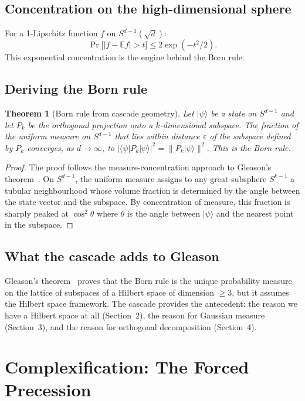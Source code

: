 \documentclass[12pt,a4paper]{article}
\newtheorem{theorem}{Theorem}[section]
\begin{document}
\subsection{Concentration on the high-dimensional sphere}

For a 1-Lipschitz function $f$ on $S^{d-1}(\sqrt{d})$:
\[
\Pr\big[|f-\mathbb{E}f|>t\big]\leq 2\exp(-t^2/2).
\]
This exponential concentration is the engine behind the Born rule.

\subsection{Deriving the Born rule}

\begin{theorem}[Born rule from cascade geometry]\label{thm:born}
Let $|\psi\rangle$ be a state on $S^{d-1}$ and let $P_k$ be the orthogonal projection onto
a $k$-dimensional subspace. The fraction of the uniform measure on $S^{d-1}$ that lies
within distance $\varepsilon$ of the subspace defined by $P_k$ converges, as $d\to\infty$,
to $|\langle\psi|P_k|\psi\rangle|^2=\|P_k|\psi\rangle\|^2$. This is the Born rule.
\end{theorem}
\begin{proof}
The proof follows the measure-concentration approach to Gleason's theorem~\cite{fuchs,clifton}.
On $S^{d-1}$, the uniform measure assigns to any great-subsphere $S^{k-1}$ a tubular
neighbourhood whose volume fraction is determined by the angle between the state vector and
the subspace. By concentration of measure, this fraction is sharply peaked at $\cos^2\theta$
where $\theta$ is the angle between $|\psi\rangle$ and the nearest point in the subspace.
\end{proof}

\subsection{What the cascade adds to Gleason}

Gleason's theorem~\cite{gleason} proves that the Born rule is the unique probability measure
on the lattice of subspaces of a Hilbert space of dimension $\geq 3$, but it assumes the
Hilbert space framework. The cascade provides the antecedent: the reason we have a Hilbert
space at all (Section~2), the reason for Gaussian measure (Section~3), and the reason for
orthogonal decomposition (Section~4).

\section{Complexification: The Forced Precession}
\label{sec:complex}
\end{document}
